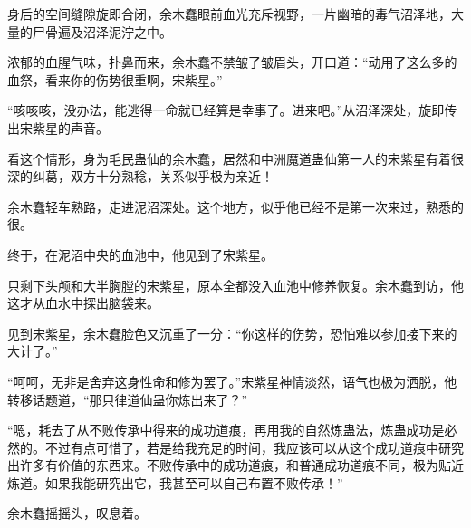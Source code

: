 \begin{this_body}
身后的空间缝隙旋即合闭，余木蠢眼前血光充斥视野，一片幽暗的毒气沼泽地，大量的尸骨遍及沼泽泥泞之中。

浓郁的血腥气味，扑鼻而来，余木蠢不禁皱了皱眉头，开口道：“动用了这么多的血祭，看来你的伤势很重啊，宋紫星。”

“咳咳咳，没办法，能逃得一命就已经算是幸事了。进来吧。”从沼泽深处，旋即传出宋紫星的声音。

看这个情形，身为毛民蛊仙的余木蠢，居然和中洲魔道蛊仙第一人的宋紫星有着很深的纠葛，双方十分熟稔，关系似乎极为亲近！

余木蠢轻车熟路，走进泥沼深处。这个地方，似乎他已经不是第一次来过，熟悉的很。

终于，在泥沼中央的血池中，他见到了宋紫星。

只剩下头颅和大半胸膛的宋紫星，原本全都没入血池中修养恢复。余木蠢到访，他这才从血水中探出脑袋来。

见到宋紫星，余木蠢脸色又沉重了一分：“你这样的伤势，恐怕难以参加接下来的大计了。”

“呵呵，无非是舍弃这身性命和修为罢了。”宋紫星神情淡然，语气也极为洒脱，他转移话题道，“那只律道仙蛊你炼出来了？”

“嗯，耗去了从不败传承中得来的成功道痕，再用我的自然炼蛊法，炼蛊成功是必然的。不过有点可惜了，若是给我充足的时间，我应该可以从这个成功道痕中研究出许多有价值的东西来。不败传承中的成功道痕，和普通成功道痕不同，极为贴近炼道。如果我能研究出它，我甚至可以自己布置不败传承！”

余木蠢摇摇头，叹息着。

\end{this_body}

